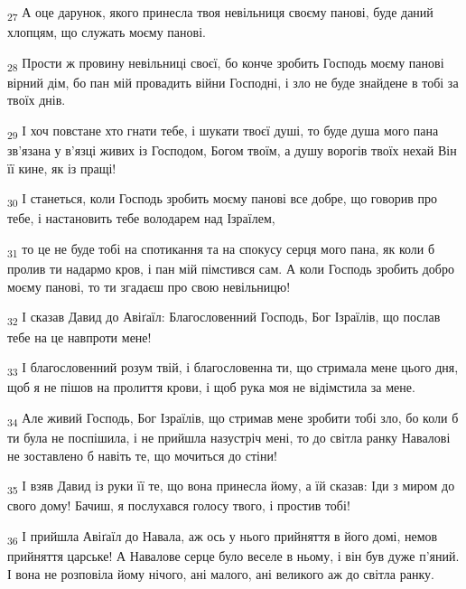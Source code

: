 \begin{tcolorbox}
\textsubscript{27} А оце дарунок, якого принесла твоя невільниця своєму панові, буде даний хлопцям, що служать моєму панові.
\end{tcolorbox}
\begin{tcolorbox}
\textsubscript{28} Прости ж провину невільниці своєї, бо конче зробить Господь моєму панові вірний дім, бо пан мій провадить війни Господні, і зло не буде знайдене в тобі за твоїх днів.
\end{tcolorbox}
\begin{tcolorbox}
\textsubscript{29} І хоч повстане хто гнати тебе, і шукати твоєї душі, то буде душа мого пана зв'язана у в'язці живих із Господом, Богом твоїм, а душу ворогів твоїх нехай Він її кине, як із пращі!
\end{tcolorbox}
\begin{tcolorbox}
\textsubscript{30} І станеться, коли Господь зробить моєму панові все добре, що говорив про тебе, і настановить тебе володарем над Ізраїлем,
\end{tcolorbox}
\begin{tcolorbox}
\textsubscript{31} то це не буде тобі на спотикання та на спокусу серця мого пана, як коли б пролив ти надармо кров, і пан мій пімстився сам. А коли Господь зробить добро моєму панові, то ти згадаєш про свою невільницю!
\end{tcolorbox}
\begin{tcolorbox}
\textsubscript{32} І сказав Давид до Авіґаїл: Благословенний Господь, Бог Ізраїлів, що послав тебе на це навпроти мене!
\end{tcolorbox}
\begin{tcolorbox}
\textsubscript{33} І благословенний розум твій, і благословенна ти, що стримала мене цього дня, щоб я не пішов на пролиття крови, і щоб рука моя не відімстила за мене.
\end{tcolorbox}
\begin{tcolorbox}
\textsubscript{34} Але живий Господь, Бог Ізраїлів, що стримав мене зробити тобі зло, бо коли б ти була не поспішила, і не прийшла назустріч мені, то до світла ранку Навалові не зоставлено б навіть те, що мочиться до стіни!
\end{tcolorbox}
\begin{tcolorbox}
\textsubscript{35} І взяв Давид із руки її те, що вона принесла йому, а їй сказав: Іди з миром до свого дому! Бачиш, я послухався голосу твого, і простив тобі!
\end{tcolorbox}
\begin{tcolorbox}
\textsubscript{36} І прийшла Авіґаїл до Навала, аж ось у нього прийняття в його домі, немов прийняття царське! А Навалове серце було веселе в ньому, і він був дуже п'яний. І вона не розповіла йому нічого, ані малого, ані великого аж до світла ранку.
\end{tcolorbox}
